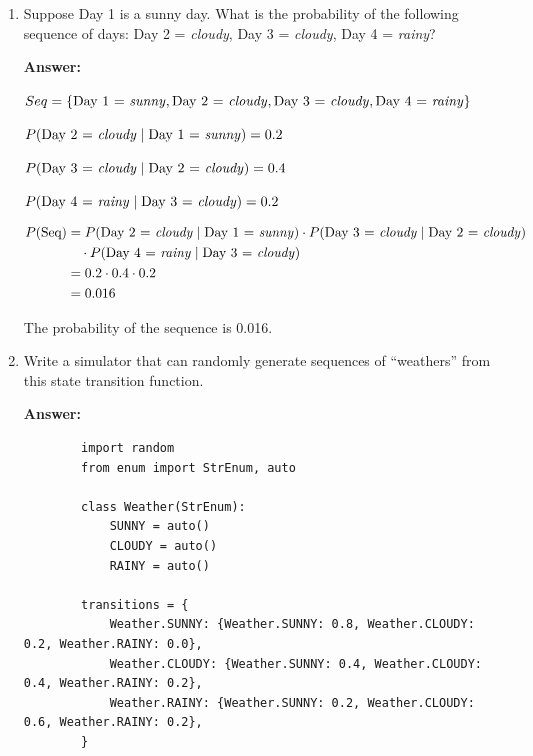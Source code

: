 \documentclass{article}
\begin{document}
\begin{enumerate}
    \item[(a)] Suppose Day 1 is a sunny day. What is the probability of the following sequence of days:
    Day 2 = \textit{cloudy}, Day 3 = \textit{cloudy}, Day 4 = \textit{rainy}?

    \textbf{Answer:}

    $
    Seq = \{\text{Day 1 = \textit{sunny}}, \text{Day 2 = \textit{cloudy}}, \text{Day 3 = \textit{cloudy}}, \text{Day 4 = \textit{rainy}}\}
    $

    $
    P(\text{Day 2 = \textit{cloudy}} \mid \text{Day 1 = \textit{sunny}}) = 0.2
    $

    $
    P(\text{Day 3 = \textit{cloudy}} \mid \text{Day 2 = \textit{cloudy}}) = 0.4
    $

    $
    P(\text{Day 4 = \textit{rainy}} \mid \text{Day 3 = \textit{cloudy}}) = 0.2
    $

    $
    \begin{aligned}
    P(\text{Seq})
    &= P(\text{Day 2 = \textit{cloudy}} \mid \text{Day 1 = \textit{sunny}}) \cdot P(\text{Day 3 = \textit{cloudy}} \mid \text{Day 2 = \textit{cloudy}}) \\
    &\quad \cdot P(\text{Day 4 = \textit{rainy}} \mid \text{Day 3 = \textit{cloudy}}) \\
    &= 0.2 \cdot 0.4 \cdot 0.2 \\
    &= 0.016
    \end{aligned}
    $

    The probability of the sequence is 0.016.

    \item[(b)] Write a simulator that can randomly generate sequences of ``weathers'' from this state transition function.

    \textbf{Answer:}

    \begin{listing}[H]
        \caption{Weather Markov Chain Simulation}
        \label{lst:weather_sim}
        \begin{verbatim}
        import random
        from enum import StrEnum, auto

        class Weather(StrEnum):
            SUNNY = auto()
            CLOUDY = auto()
            RAINY = auto()

        transitions = {
            Weather.SUNNY: {Weather.SUNNY: 0.8, Weather.CLOUDY: 0.2, Weather.RAINY: 0.0},
            Weather.CLOUDY: {Weather.SUNNY: 0.4, Weather.CLOUDY: 0.4, Weather.RAINY: 0.2},
            Weather.RAINY: {Weather.SUNNY: 0.2, Weather.CLOUDY: 0.6, Weather.RAINY: 0.2},
        }


\end{verbatim}
\end{listing}
\end{enumerate}
\end{document}

